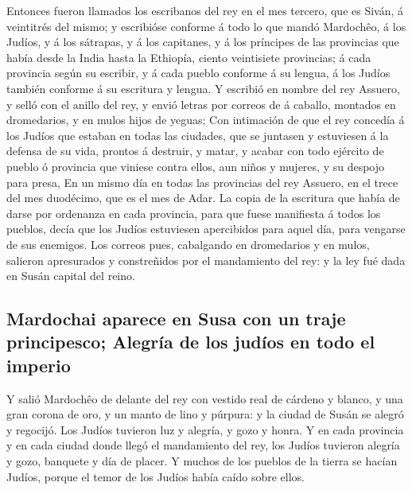  Entonces fueron llamados los escribanos del rey en el mes
tercero, que es Siván, á veintitrés del mismo; y escribióse conforme á
todo lo que mandó Mardochêo, á los Judíos, y á los sátrapas, y á los
capitanes, y á los príncipes de las provincias que había desde la India
hasta la Ethiopía, ciento veintisiete provincias; á cada provincia según
su escribir, y á cada pueblo conforme á su lengua, á los Judíos también
conforme á su escritura y lengua.  Y escribió en nombre
del rey Assuero, y selló con el anillo del rey, y envió letras por
correos de á caballo, montados en dromedarios, y en mulos hijos de
yeguas;  Con intimación de que el rey concedía á los
Judíos que estaban en todas las ciudades, que se juntasen y estuviesen á
la defensa de su vida, prontos á destruir, y matar, y acabar con todo
ejército de pueblo ó provincia que viniese contra ellos, aun niños y
mujeres, y su despojo para presa,  En un mismo día en
todas las provincias del rey Assuero, en el trece del mes duodécimo, que
es el mes de Adar.  La copia de la escritura que había de
darse por ordenanza en cada provincia, para que fuese manifiesta á todos
los pueblos, decía que los Judíos estuviesen apercibidos para aquel día,
para vengarse de sus enemigos.  Los correos pues,
cabalgando en dromedarios y en mulos, salieron apresurados y
constreñidos por el mandamiento del rey: y la ley fué dada en Susán
capital del reino.

\hypertarget{mardochai-aparece-en-susa-con-un-traje-principesco-alegruxeda-de-los-juduxedos-en-todo-el-imperio}{%
\subsection{Mardochai aparece en Susa con un traje principesco; Alegría
de los judíos en todo el
imperio}\label{mardochai-aparece-en-susa-con-un-traje-principesco-alegruxeda-de-los-juduxedos-en-todo-el-imperio}}

 Y salió Mardochêo de delante del rey con vestido real de
cárdeno y blanco, y una gran corona de oro, y un manto de lino y
púrpura: y la ciudad de Susán se alegró y regocijó.  Los
Judíos tuvieron luz y alegría, y gozo y honra.  Y en cada
provincia y en cada ciudad donde llegó el mandamiento del rey, los
Judíos tuvieron alegría y gozo, banquete y día de placer. Y muchos de
los pueblos de la tierra se hacían Judíos, porque el temor de los Judíos
había caído sobre ellos.


